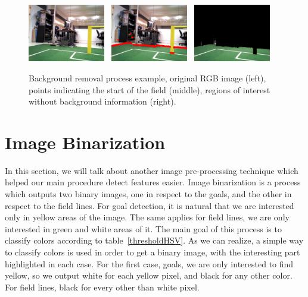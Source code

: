 \documentclass[	DIV=calc,%
							paper=a4,%
							fontsize=11pt,%
							twocolumn]{scrartcl}	 					%
\begin{document}
\begin{figure}[t!]
\caption{Background removal process example, original RGB image (left), points indicating the start of the field (middle), regions of interest without background information (right).}
\label{background}
\centering    
\includegraphics[width=0.3\textwidth]{figures/original.png} \	
\includegraphics[width=0.3\textwidth]{figures/back.png} \	
\includegraphics[width=0.3\textwidth]{figures/back_fixed.png}	
\end{figure}


\section{Image Binarization}
In this section, we will talk about another image pre-processing technique which helped our main procedure detect features easier. Image binarization is a process which outputs two binary images, one in respect to the goals, and the other in respect to the field lines. For goal detection, it is natural that we are interested only in yellow areas of the image. The same applies for field lines, we are only interested in green and white areas of it. The main goal of this process is to classify colors according to table~\ref{thresholdHSV}. As we can realize, a simple way to classify colors is used in order to get a binary image, with the interesting part highlighted in each case. For the first case, goals, we are only interested to find yellow, so we output white for each yellow pixel, and black for any other color. For field lines, black for every other than white pixel.
\end{document}
